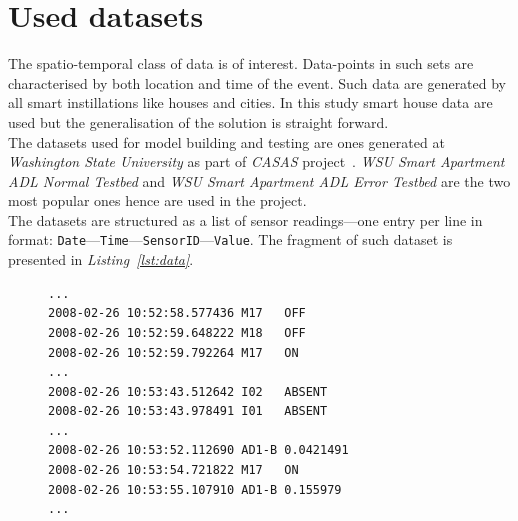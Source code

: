 \documentclass[12pt, a4paper, pdflatex, leqno, twoside]{report}
\begin{document}







\section{Used datasets}
The spatio-temporal class of data is of interest. Data-points in such sets are characterised by both location and time of the event. Such data are generated by all smart instillations like houses and cities. In this study smart house data are used but the generalisation of the solution is straight forward.\\ %

The datasets used for model building and testing are ones generated at \emph{Washington State University} as part of \emph{CASAS} project~\citep{cook2009assessing}. \emph{WSU Smart Apartment ADL Normal Testbed} and \emph{WSU Smart Apartment ADL Error Testbed} are the two most popular ones hence are used in the project.\\

The datasets are structured as a list of sensor readings---one entry per line in format: \texttt{Date}---\texttt{Time}---\texttt{SensorID}---\texttt{Value}. The fragment of such dataset is presented in \emph{Listing~\ref{lst:data}}.

\begin{figure}
\lstset{
  captionpos=b,
  frame=single,
  language=HTML,
  breaklines=true,
  caption=CASAS dataset structure.,
  label=lst:data,
  float=tb
}
\begin{lstlisting}
...
2008-02-26 10:52:58.577436 M17   OFF
2008-02-26 10:52:59.648222 M18   OFF
2008-02-26 10:52:59.792264 M17   ON
...
2008-02-26 10:53:43.512642 I02   ABSENT
2008-02-26 10:53:43.978491 I01   ABSENT
...
2008-02-26 10:53:52.112690 AD1-B 0.0421491
2008-02-26 10:53:54.721822 M17   ON
2008-02-26 10:53:55.107910 AD1-B 0.155979
...
\end{lstlisting}
\end{figure}
\end{document}
